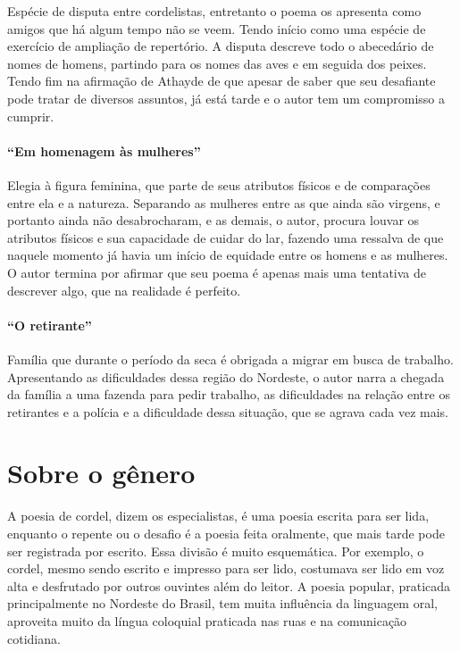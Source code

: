 Espécie de disputa entre cordelistas, entretanto o poema os apresenta
como amigos que há algum tempo não se veem. Tendo início como uma
espécie de exercício de ampliação de repertório. A disputa descreve
todo o abecedário de nomes de homens, partindo para os nomes das aves e
em seguida dos peixes. Tendo fim na afirmação de Athayde de que apesar
de saber que seu desafiante pode tratar de diversos assuntos, já está
tarde e o autor tem um compromisso a cumprir.

\paragraph{``Em homenagem às mulheres''}

Elegia à figura feminina, que parte de seus atributos físicos e de
comparações entre ela e a natureza. Separando as mulheres entre as que
ainda são virgens, e portanto ainda não desabrocharam, e as demais, o
autor, procura louvar os atributos físicos e sua capacidade de cuidar
do lar, fazendo uma ressalva de que naquele momento já havia um início
de equidade entre os homens e as mulheres. O autor termina por afirmar
que seu poema é apenas mais uma tentativa de descrever algo, que na
realidade é perfeito. 

\paragraph{``O retirante''}

Família que durante o período da seca é obrigada a migrar em busca de
trabalho. Apresentando as dificuldades dessa região do Nordeste, o
autor narra a chegada da família a uma fazenda para pedir trabalho, as
dificuldades na relação entre os retirantes e a polícia e a
dificuldade dessa situação, que se agrava cada vez mais. 

\section{Sobre o gênero}

A poesia de cordel, dizem os especialistas, é uma poesia escrita para
ser lida, enquanto o repente ou o desafio é a poesia feita oralmente,
que mais tarde pode ser registrada por escrito. Essa divisão é muito
esquemática. Por exemplo, o cordel, mesmo sendo escrito e impresso para
ser lido, costumava ser lido em voz alta e desfrutado por outros
ouvintes além do leitor. A poesia popular, praticada principalmente no
Nordeste do Brasil, tem muita influência da linguagem oral, aproveita
muito da língua coloquial praticada nas ruas e na comunicação
cotidiana. 

